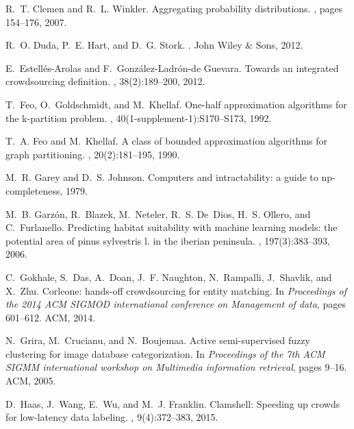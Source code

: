 \documentclass[11pt]{article}
\begin{document}
\begin{thebibliography}{10}
	R.~T. Clemen and R.~L. Winkler.
	\newblock Aggregating probability distributions.
	, pages 154--176, 2007.
	
	R.~O. Duda, P.~E. Hart, and D.~G. Stork.
	.
	\newblock John Wiley \& Sons, 2012.
	
	E.~Estell{\'e}s-Arolas and F.~Gonz{\'a}lez-Ladr{\'o}n-de Guevara.
	\newblock Towards an integrated crowdsourcing definition.
	, 38(2):189--200, 2012.
	
	T.~Feo, O.~Goldschmidt, and M.~Khellaf.
	\newblock One-half approximation algorithms for the k-partition problem.
	, 40(1-supplement-1):S170--S173, 1992.
	
	T.~A. Feo and M.~Khellaf.
	\newblock A class of bounded approximation algorithms for graph partitioning.
	, 20(2):181--195, 1990.
	
	M.~R. Garey and D.~S. Johnson.
	\newblock Computers and intractability: a guide to np-completeness, 1979.
	
	M.~B. Garz{\'o}n, R.~Blazek, M.~Neteler, R.~S. De~Dios, H.~S. Ollero, and
	C.~Furlanello.
	\newblock Predicting habitat suitability with machine learning models: the
	potential area of pinus sylvestris l. in the iberian peninsula.
	, 197(3):383--393, 2006.
	
	C.~Gokhale, S.~Das, A.~Doan, J.~F. Naughton, N.~Rampalli, J.~Shavlik, and
	X.~Zhu.
	\newblock Corleone: hands-off crowdsourcing for entity matching.
	\newblock In {\em Proceedings of the 2014 ACM SIGMOD international conference
		on Management of data}, pages 601--612. ACM, 2014.
	
	N.~Grira, M.~Crucianu, and N.~Boujemaa.
	\newblock Active semi-supervised fuzzy clustering for image database
	categorization.
	\newblock In {\em Proceedings of the 7th ACM SIGMM international workshop on
		Multimedia information retrieval}, pages 9--16. ACM, 2005.
	
	D.~Haas, J.~Wang, E.~Wu, and M.~J. Franklin.
	\newblock Clamshell: Speeding up crowds for low-latency data labeling.
	, 9(4):372--383, 2015.
	

\end{thebibliography}
\end{document}
